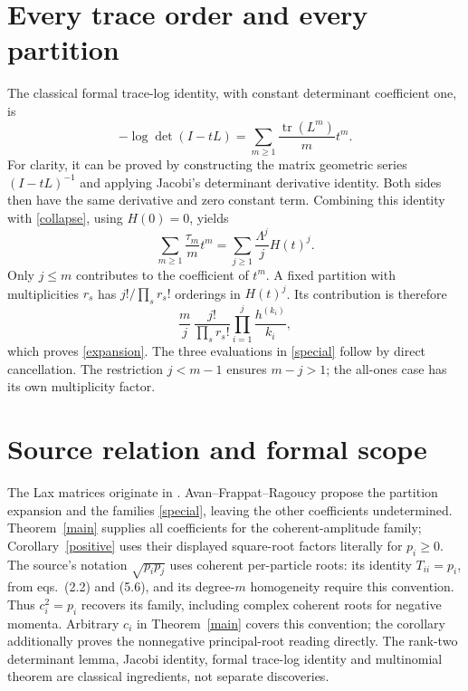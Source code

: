 \documentclass[11pt]{article}
\begin{document}
\section*{Every trace order and every partition}
The classical formal trace-log identity, with constant determinant coefficient one, is
\[
 -\log\det(I-tL)=\sum_{m\geq1}\frac{\operatorname{tr}(L^m)}m t^m.
\]
For clarity, it can be proved by constructing the matrix geometric series $(I-tL)^{-1}$ and applying Jacobi's determinant derivative identity. Both sides then have the same derivative and zero constant term. Combining this identity with \eqref{collapse}, using $H(0)=0$, yields
\begin{equation}\label{log}
 \sum_{m\geq1}\frac{\tau_m}m t^m
   =\sum_{j\geq1}\frac{\Lambda^j}{j}H(t)^j.
\end{equation}
Only $j\leq m$ contributes to the coefficient of $t^m$. A fixed partition with multiplicities $r_s$ has $j!/\prod_s r_s!$ orderings in $H(t)^j$. Its contribution is therefore
\[
 \frac mj\,\frac{j!}{\prod_s r_s!}\prod_{i=1}^j\frac{h^{(k_i)}}{k_i},
\]
which proves \eqref{expansion}. The three evaluations in \eqref{special} follow by direct cancellation. The restriction $j<m-1$ ensures $m-j>1$; the all-ones case has its own multiplicity factor.

\section*{Source relation and formal scope}
The Lax matrices originate in \cite{RB,AFR2023}. Avan--Frappat--Ragoucy \cite[Conjecture~5.2, eqs.~(5.20)--(5.21)]{AFR} propose the partition expansion and the families \eqref{special}, leaving the other coefficients undetermined. Theorem~\ref{main} supplies all coefficients for the coherent-amplitude family; Corollary~\ref{positive} uses their displayed square-root factors literally for $p_i\geq0$. The source's notation $\sqrt{p_ip_j}$ uses coherent per-particle roots: its identity $T_{ii}=p_i$, from eqs.~(2.2) and (5.6), and its degree-$m$ homogeneity require this convention. Thus $c_i^2=p_i$ recovers its family, including complex coherent roots for negative momenta. Arbitrary $c_i$ in Theorem~\ref{main} covers this convention; the corollary additionally proves the nonnegative principal-root reading directly. The rank-two determinant lemma, Jacobi identity, formal trace-log identity and multinomial theorem are classical ingredients, not separate discoveries.
\end{document}
